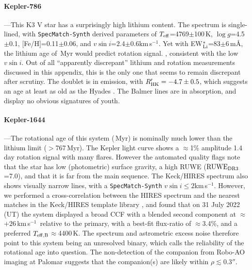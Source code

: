 \documentclass[11pt,twocolumn,tighten]{aastex63}
\newcommand{\kms}{{km\,s$^{-1}$}}
\begin{document}


\paragraph{Kepler-786}---This K3 V star has a surprisingly high
lithium content.  The spectrum is single-lined, with
\texttt{SpecMatch-Synth} derived parameters of $T_{\rm
eff}$=4769$\pm$100\,K, $\log g$=4.5$\pm$0.1, [Fe/H]=0.11$\pm$0.06, and
$v\sin i$=2.4$\pm$0.6\kms.  Yet with EW$_{\rm
Li}^{\ast}$=83$\pm$6\,m\AA, the lithium age of \kepseveneightsix\,Myr
would predict  rotation signal.  , consistent with the low $v\sin i$.  Out of all
``apparently discrepant'' lithium and rotation measurements discussed
in this appendix, this is the only one that seems to remain discrepant
after scrutiny.  The   doublet is in emission, with
$R'_{\rm HK}=-4.7\pm0.5$, which suggests an age at least as old as the
Hyades \citep{Mamajek_2008}.  The Balmer lines are in absorption, and
display no obvious signatures of youth.


\paragraph{Kepler-1644}---The rotational age of this system
(\kepsixteenfourfour\,Myr) is nominally much lower than the lithium
limit ($>$767\,Myr).  The Kepler light curve shows a $\approx$1\%
amplitude 1.4\,day rotation signal with many flares.  However the
automated quality flags note that the star has low (photometric)
surface gravity, a high RUWE (${\rm RUWE}_{\rm DR3}$=7.0), and that it
is far from the main sequence.  The Keck/HIRES spectrum also shows
visually narrow lines, with a \texttt{SpecMatch-Synth} $v \sin i \leq
2$\kms.  However, we performed a cross-correlation between the HIRES
spectrum and the nearest matches in the Keck/HIRES template library
\citep{2015AJ....149...18K}, and found that on 31 July 2022 (UT) the
system displayed a broad CCF with a blended second component at
$\approx$$+26$\,\kms\ relative to the primary, with a best-fit
flux-ratio of $\approx$3.4\%, and a preferred $T_{\rm
eff,B}$$\approx$4400\,K.  The spectrum and astrometric excess noise
therefore point to this system being an unresolved binary, which calls
the reliability of the rotational age into question.  The
non-detection of the companion from Robo-AO imaging at Palomar
\citep{2017AJ....153...66Z} suggests that the companion(s) are likely
within $\rho$$\lesssim$0.3$''$.
\end{document}
